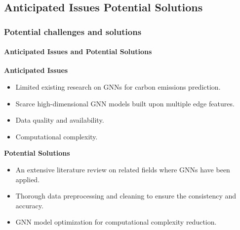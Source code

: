 \documentclass[light]{lutbeamer} %
\begin{document}
\subsection{Anticipated Issues Potential Solutions}
\begin{frame}
    \frametitle{Potential challenges and solutions}
    \framesubtitle{Anticipated Issues and Potential Solutions}
    \begin{minipage}[t]{0.45\textwidth}
        \textbf{Anticipated Issues}
        \begin{itemize}
            \item Limited existing research on GNNs for carbon emissions prediction.
            \item Scarce high-dimensional GNN models built upon multiple edge features.
            \item Data quality and availability.
            \item Computational complexity.
        \end{itemize}
    \end{minipage}
    \hfill
    \begin{minipage}[t]{0.45\textwidth}
        \textbf{Potential Solutions}
        \begin{itemize}
            \item An extensive literature review on related fields where GNNs have been applied.
            \item Thorough data preprocessing and cleaning to ensure the consistency and accuracy.
            \item GNN model optimization for computational complexity reduction.
        \end{itemize}
    \end{minipage}


\end{frame}
\end{document}
